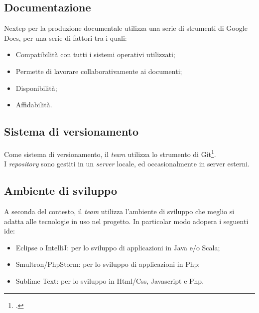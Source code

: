 \subsection{Documentazione}
Nextep per la produzione documentale utilizza una serie di strumenti di Google Docs, per una serie di fattori tra i quali:
\begin{itemize}
\item Compatibilità con tutti i sistemi operativi utilizzati;
\item Permette di lavorare collaborativamente ai documenti;
\item Disponibilità;
\item Affidabilità.
\end{itemize}
\subsection{Sistema di versionamento}
Come sistema di versionamento, il \emph{team} utilizza lo strumento di Git\footcite{https://git-scm.com/}.\\I \emph{repository} sono gestiti in un \emph{server} locale, ed occasionalmente in server esterni.
\subsection{Ambiente di sviluppo}
A seconda del contesto, il \emph{team} utilizza l'ambiente di sviluppo che meglio si adatta alle tecnologie in uso nel progetto. In particolar modo adopera i seguenti \gls{ide}:
\begin{itemize}
\item Eclipse o IntelliJ: per lo sviluppo di applicazioni in Java e/o Scala;
\item Smultron/PhpStorm: per lo sviluppo di applicazioni in Php;
\item Sublime Text: per lo sviluppo in Html/Css, Javascript e Php.
\end{itemize}
\newpage
